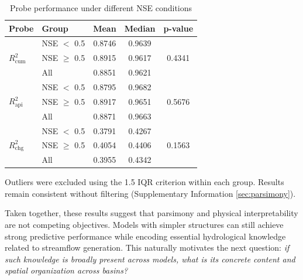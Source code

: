 \begin{table}[htbp]
    \centering
    \begin{threeparttable}
        \caption{Probe performance under different NSE conditions}
        \begin{tabular*}{\textwidth}{@{\extracolsep{\fill}}llccc}
            \toprule
            Probe & Group & Mean & Median & p-value \\
            \midrule

            \multirow{3}{*}{$R^2_{\mathrm{cum}}$}
            & NSE $<$ 0.5    & 0.8746 & 0.9639 & \multirow{3}{*}{0.4341} \\
            & NSE $\geq$ 0.5 & 0.8915 & 0.9617 & \\
            & All            & 0.8851 & 0.9621 & \\

            \midrule

            \multirow{3}{*}{$R^2_{\mathrm{api}}$}
            & NSE $<$ 0.5    & 0.8795 & 0.9682 & \multirow{3}{*}{0.5676} \\
            & NSE $\geq$ 0.5 & 0.8917 & 0.9651 & \\
            & All            & 0.8871 & 0.9663 & \\

            \midrule

            \multirow{3}{*}{$R^2_{\mathrm{chg}}$}
            & NSE $<$ 0.5    & 0.3791 & 0.4267 & \multirow{3}{*}{0.1563} \\
            & NSE $\geq$ 0.5 & 0.4054 & 0.4406 & \\
            & All            & 0.3955 & 0.4342 & \\

            \bottomrule
        \end{tabular*}

        \begin{tablenotes}
            \footnotesize
            \item Outliers were excluded using the 1.5 IQR criterion within each group. Results remain consistent without filtering (Supplementary Information \ref{sec:parsimony}).
        \end{tablenotes}
        \label{tab:probe}
    \end{threeparttable}
\end{table}

Taken together, these results suggest that parsimony and physical interpretability are not competing objectives. Models with simpler structures can still achieve strong predictive performance while encoding essential hydrological knowledge related to streamflow generation. This naturally motivates the next question: \textit{if such knowledge is broadly present across models, what is its concrete content and spatial organization across basins?}

